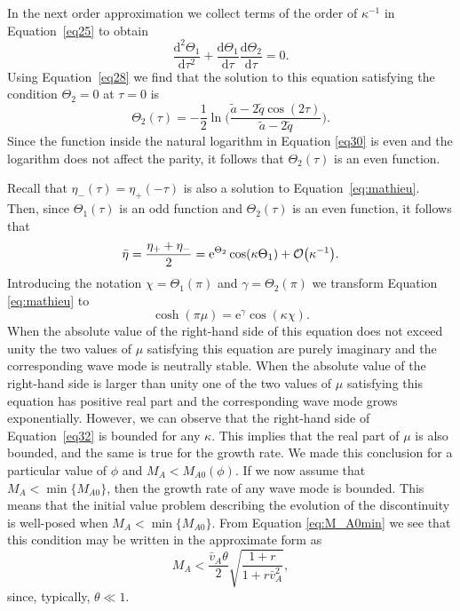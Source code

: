 \documentclass[12pt]{ociamthesis}
\begin{document}
In the next order approximation we collect terms of the order of $\kappa^{-1}$ in Equation~\eqref{eq25} to obtain
%
\begin{equation}
\label{eq29}
\frac{\mathrm{d}^2\Theta_1}{\mathrm{d}\tau^2} + 
\frac{\mathrm{d}\Theta_1}{\mathrm{d}\tau}
\frac{\mathrm{d}\Theta_2}{\mathrm{d}\tau} = 0. 
\end{equation}
%
Using Equation~\eqref{eq28} we find that the solution to this equation satisfying the condition $\Theta_2 = 0$ at $\tau = 0$ is
%
\begin{equation}
\label{eq30}
\Theta_2 (\tau) = -\frac{1}{2} \ln \bigg( \frac{\tilde{a} - 2\tilde{q}\cos(2\tau)}{\tilde{a} - 2\tilde{q}} \bigg).
\end{equation}
%
Since the function inside the natural logarithm in Equation \eqref{eq30} is even and the logarithm does not affect the parity, it follows that $\Theta_2(\tau)$ is an even function.

Recall that $\eta_-(\tau) = \eta_+(-\tau)$ is also a solution to Equation~\eqref{eq:mathieu}. Then, since $\Theta_1(\tau)$ is an odd function and $\Theta_2(\tau)$ is an even function, it follows that 
%
\begin{equation}
\label{eq31}
\bar\eta = \frac{\eta_+ + \eta_-}2 = 
\mathrm{e}^{\Theta_2}\cos(\kappa\Theta_1) + {\cal O}\big(\kappa^{-1}\big).
\end{equation}
% 
Introducing the notation $\chi = \Theta_1(\pi)$ and $\gamma = \Theta_2(\pi)$ we transform Equation \eqref{eq:mathieu} to
%
\begin{equation}
\label{eq32}
\cosh(\pi\mu) = \mathrm{e}^\gamma\cos(\kappa\chi).
\end{equation}
%
When the absolute value of the right-hand side of this equation does not exceed unity the two values of $\mu$ satisfying this equation are purely imaginary and the corresponding wave mode is neutrally stable. When the absolute value of the right-hand side is larger than unity one of the two values of $\mu$ satisfying this equation has positive real part and the corresponding wave mode grows exponentially.
However, we can observe that the right-hand side of Equation~\eqref{eq32} is bounded for any $\kappa$.
This implies that the real part of $\mu$ is also bounded, and the same is true for the growth rate.
We made this conclusion for a particular value of $\phi$ and $M_A < M_{A0}(\phi)$.
If we now assume that $M_A < \min \{ M_{A0} \}$, then the growth rate of any wave mode is bounded.
This means that the initial value problem describing the evolution of the discontinuity is well-posed when $M_A < \min \{ M_{A0} \}$.
From Equation \eqref{eq:M_A0min} we see that this condition may be written in the approximate form as
%
\begin{equation}
\label{eq33}
M_A < \frac{\bar v_A\theta}2\sqrt{\frac{1 + r}{1 + r \bar v_A^2}}, 
\end{equation}
%
since, typically, $\theta \ll 1$.
\end{document}
